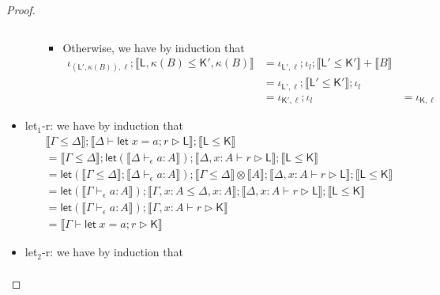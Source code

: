 \documentclass[acmsmall,screen,review]{acmart}
\newcommand{\ms}[1]{\ensuremath{\mathsf{#1}}}
\newcommand{\letstmt}[3]{\ensuremath{\ms{let}\;#1 = #2; #3}}
\newcommand{\bhyp}[2]{#1 : #2}
\newcommand{\hasty}[4]{#1 \vdash_{#2} #3: {#4}}
\newcommand{\haslb}[3]{#1 \vdash #2 \rhd #3}
\newcommand{\brle}[1]{{\textsf{#1}}}
\newcommand{\dnt}[1]{\llbracket{#1}\rrbracket}
\newcommand{\lmor}[1]{\ms{let}(#1)}
\begin{document}
\begin{proof}
\begin{itemize}
\begin{itemize}
\begin{itemize}
\begin{equation}
        \end{equation}
        \item Otherwise, we have by induction that
        \begin{equation}
          \begin{aligned}
          \iota_{(\ms{L}', \kappa(B)), \ell}
          ; \dnt{\ms{L}, \kappa(B) \leq \ms{K}', \kappa(B)}
          & = \iota_{\ms{L}', \ell} ; \iota_l ; \dnt{\ms{L}' \leq \ms{K}'} + \dnt{B} \\
          & = \iota_{\ms{L}', \ell} ; \dnt{\ms{L}' \leq \ms{K}'} ; \iota_l \\
          & = \iota_{\ms{K}', \ell} ; \iota_l & = \iota_{\ms{K}, \ell}
          \end{aligned}
        \end{equation}
      \end{itemize}
    \end{itemize}
    \item \brle{let$_1$-r}: we have by induction that
    \begin{equation}
      \begin{aligned}
        & \dnt{\Gamma \leq \Delta} 
          ; \dnt{\haslb{\Delta}{\letstmt{x}{a}{r}}{\ms{L}}} 
          ; \dnt{\ms{L} \leq \ms{K}} \\
        & = \dnt{\Gamma \leq \Delta}
          ; \lmor{\dnt{\hasty{\Delta}{\epsilon}{a}{A}}}
          ; \dnt{\haslb{\Delta, \bhyp{x}{A}}{r}{\ms{L}}}
          ; \dnt{\ms{L} \leq \ms{K}} \\
        & = \lmor{\dnt{\Gamma \leq \Delta} ; \dnt{\hasty{\Delta}{\epsilon}{a}{A}}}
          ; \dnt{\Gamma \leq \Delta} \otimes \dnt{A}
          ; \dnt{\haslb{\Delta, \bhyp{x}{A}}{r}{\ms{L}}}
          ; \dnt{\ms{L} \leq \ms{K}} \\
        & = \lmor{\dnt{\hasty{\Gamma}{\epsilon}{a}{A}}}
          ; \dnt{\Gamma, \bhyp{x}{A} \leq \Delta, \bhyp{x}{A}}
          ; \dnt{\haslb{\Delta, \bhyp{x}{A}}{r}{\ms{L}}}
          ; \dnt{\ms{L} \leq \ms{K}} \\
        & = \lmor{\dnt{\hasty{\Gamma}{\epsilon}{a}{A}}}
          ; \dnt{\haslb{\Gamma, \bhyp{x}{A}}{r}{\ms{K}}} \\
        & = \dnt{\haslb{\Gamma}{\letstmt{x}{a}{r}}{\ms{K}}}
      \end{aligned}
    \end{equation}
    \item \brle{let$_2$-r}: we have by induction that
    \begin{equation}
      \begin{aligned}

\end{aligned}
\end{equation}
\end{itemize}
\end{proof}
\end{document}
